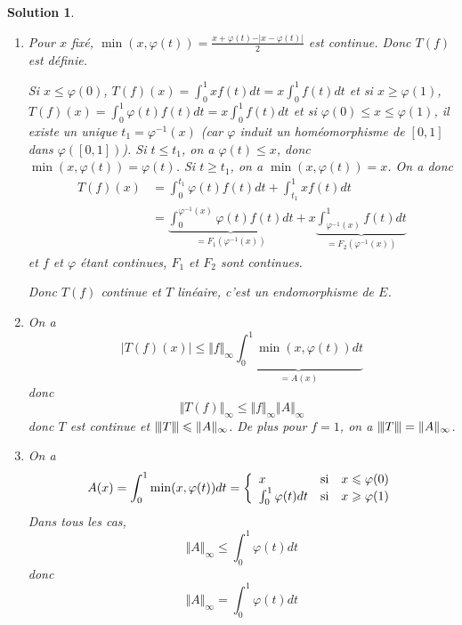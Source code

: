 \documentclass[12pt]{article}
\newtheorem{solution}{Solution}[section]
\theoremstyle{remark}
\newcommand{\vertiii}[1]{{\left\vert\kern-0.25ex\left\vert\kern-0.25ex\left\vert{}#1
\right\vert\kern-0.25ex\right\vert\kern-0.25ex\right\vert}}
\numberwithin{equation}{section}
\begin{document}
\begin{solution}
	\phantom{}
	\begin{enumerate}
		\item Pour $x$ fixé, $\min(x,\varphi(t))=\frac{x+\varphi(t)-\vert x-\varphi(t)\vert}{2}$ est continue. Donc $T(f)$ est définie.
		
		Si $x\leqslant\varphi(0)$, $T(f)(x)=\int_{0}^{1}xf(t)dt=x\int_{0}^{1}f(t)dt$ et si $x\geqslant\varphi(1)$, $T(f)(x)=\int_{0}^{1}\varphi(t)f(t)dt=x\int_{0}^{1}f(t)dt$ et si $\varphi(0)\leqslant x\leqslant\varphi(1)$, il existe un unique $t_{1}=\varphi^{-1}(x)$ (car $\varphi$ induit un homéomorphisme de $[0,1]$ dans $\varphi([0,1])$). Si $t\leqslant t_{1}$, on a $\varphi(t)\leqslant x$, donc $\min(x,\varphi(t))=\varphi(t)$. Si $t\geqslant t_{1}$, on a $\min(x,\varphi(t))=x$. On a donc 
		\begin{align*}
			T(f)(x)
			&=\int_{0}^{t_{1}}\varphi(t)f(t)dt+\int_{t_{1}}^{1}xf(t)dt\\
			&=\underbrace{\int_{0}^{\varphi^{-1}(x)}\varphi(t)f(t)dt}_{=F_{1}(\varphi^{-1}(x))}+x\underbrace{\int_{\varphi^{-1}(x)}^{1}f(t)dt}_{=F_{2}(\varphi^{-1}(x))}
		\end{align*}
		et $f$ et $\varphi$ étant continues, $F_{1}$ et $F_{2}$ sont continues.

		Donc $T(f)$ continue et $T$ linéaire, c'est un endomorphisme de $E$.

		\item On a 
		\begin{equation*}
			\vert T(f)(x)\vert\leqslant\Vert f\Vert_{\infty}\underbrace{\int_{0}^{1}\min(x,\varphi(t))dt}_{=A(x)}
		\end{equation*}
		donc 
		$$\Vert T(f)\Vert_{\infty}\leqslant\Vert f\Vert_{\infty}\Vert A\Vert_{\infty}$$
		donc $T$ est continue et $\vertiii{T}\leqslant\Vert A\Vert_{\infty}$. De plus pour $f=1$, on a $\vertiii{T}=\Vert A\Vert_{\infty}$.

		\item On a 
		$$
		A(x)=\int_{0}^{1}\min(x,\varphi(t))dt=
		\left\{
			\begin{array}[]{lll}
				x & \text{si} & x\leqslant\varphi(0)\\
				\int_{0}^{1}\varphi(t)dt & \text{si} & x\geqslant\varphi(1)
			\end{array}
		\right.
		$$
		Dans tous les cas, 
		$$\Vert A\Vert_{\infty}\leqslant\int_{0}^{1}\varphi(t)dt$$
		donc 
		$$\Vert A\Vert_{\infty}=\int_{0}^{1}\varphi(t)dt$$
	\end{enumerate}
\end{solution}
\end{document}
